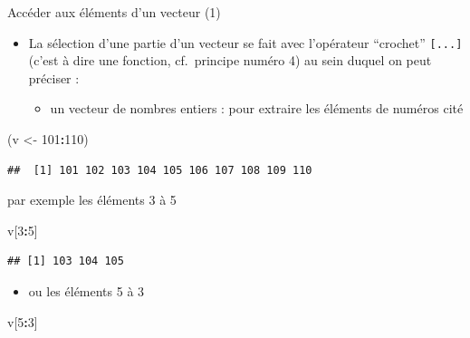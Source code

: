 \documentclass[
  ignorenonframetext,
]{beamer}
\newenvironment{Shaded}{\begin{snugshade}}{\end{snugshade}}
\newcommand{\DecValTok}[1]{\textcolor[rgb]{0.00,0.00,0.81}{#1}}
\newcommand{\NormalTok}[1]{#1}
\newcommand{\OtherTok}[1]{\textcolor[rgb]{0.56,0.35,0.01}{#1}}
\newcommand{\SpecialCharTok}[1]{\textcolor[rgb]{0.81,0.36,0.00}{\textbf{#1}}}
\providecommand{\tightlist}{%
  \setlength{\itemsep}{0pt}\setlength{\parskip}{0pt}}
\begin{document}
\begin{frame}[fragile]{Accéder aux éléments d'un vecteur (1)}
\protect\hypertarget{accuxe9der-aux-uxe9luxe9ments-dun-vecteur-1}{}
\begin{itemize}
\tightlist
\item
  La sélection d'une partie d'un vecteur se fait avec l'opérateur
  ``crochet'' \texttt{{[}...{]}} (c'est à dire une fonction,
  cf.~principe numéro 4) au sein duquel on peut préciser :

  \begin{itemize}
  \tightlist
  \item
    un vecteur de nombres entiers : pour extraire les éléments de
    numéros cité
  \end{itemize}
\end{itemize}

\tiny

\begin{Shaded}
\begin{Highlighting}[]
\NormalTok{(v }\OtherTok{\textless{}{-}} \DecValTok{101}\SpecialCharTok{:}\DecValTok{110}\NormalTok{)}
\end{Highlighting}
\end{Shaded}

\begin{verbatim}
##  [1] 101 102 103 104 105 106 107 108 109 110
\end{verbatim}

\normalsize par exemple les éléments 3 à 5

\tiny

\begin{Shaded}
\begin{Highlighting}[]
\NormalTok{v[}\DecValTok{3}\SpecialCharTok{:}\DecValTok{5}\NormalTok{]}
\end{Highlighting}
\end{Shaded}

\begin{verbatim}
## [1] 103 104 105
\end{verbatim}

\normalsize

\begin{itemize}
\tightlist
\item
  ou les éléments 5 à 3
\end{itemize}

\tiny

\begin{Shaded}
\begin{Highlighting}[]
\NormalTok{v[}\DecValTok{5}\SpecialCharTok{:}\DecValTok{3}\NormalTok{]}
\end{Highlighting}
\end{Shaded}


\end{frame}
\end{document}
